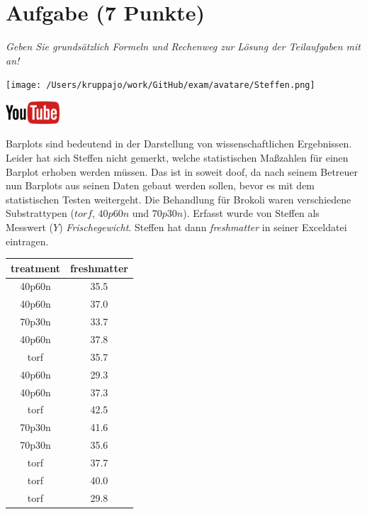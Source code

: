 \documentclass[a4paper, 9pt]{scrartcl}\usepackage[]{graphicx}\usepackage[]{xcolor}
\begin{document}
\section{Aufgabe \hfill (7 Punkte)}

\textit{Geben Sie grundsätzlich Formeln und Rechenweg zur Lösung der Teilaufgaben mit an!} \\[1Ex]
 

 
\begin{minipage}[t]{0.5\textwidth}
\texttt{[image: /Users/kruppajo/work/GitHub/exam/avatare/Steffen.png]}
\end{minipage}
\begin{minipage}[t]{0.5\textwidth}
\hfill
\href{https://youtu.be/vXnLttRL_VI}{\includegraphics[width = 2cm]{img/youtube}}\\[1Ex]
\end{minipage}
\vspace{1ex}



Barplots sind bedeutend in der Darstellung von wissenschaftlichen Ergebnissen. Leider hat sich Steffen nicht gemerkt, welche statistischen Maßzahlen für einen Barplot erhoben werden müssen. Das ist in soweit doof, da nach seinem Betreuer nun Barplots aus seinen Daten gebaut werden sollen, bevor es mit dem statistischen Testen weitergeht. Die Behandlung für Brokoli waren verschiedene Substrattypen ($torf$, $40p60n$ und $70p30n$). Erfasst wurde von Steffen als Messwert ($Y$) \textit{Frischegewicht}. Steffen hat dann \textit{freshmatter} in seiner Exceldatei eintragen.

\begin{table}[!h]
\centering
\begin{tabular}{cc}
\toprule
treatment & freshmatter\\
\midrule
40p60n & 35.5\\
40p60n & 37.0\\
70p30n & 33.7\\
40p60n & 37.8\\
torf & 35.7\\
\addlinespace
40p60n & 29.3\\
40p60n & 37.3\\
torf & 42.5\\
70p30n & 41.6\\
70p30n & 35.6\\
\addlinespace
torf & 37.7\\
torf & 40.0\\
torf & 29.8\\
\bottomrule
\end{tabular}
\end{table}
\end{document}
